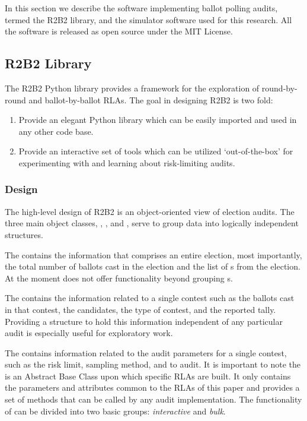 In this section we describe the software implementing ballot polling audits, termed the R2B2 library, and the simulator software used for this research. All the software is released as open source under the MIT License.
\subsection{R2B2 Library}

The R2B2 Python library \cite{r2b2_anon} provides a framework for the exploration of round-by-round
and ballot-by-ballot RLAs. The goal in designing R2B2 is two fold:
\begin{enumerate}
    \item Provide an elegant Python library which can be easily imported and used
    in any other code base.
    \item Provide an interactive set of tools which can be utilized `out-of-the-box'
    for experimenting with and learning about risk-limiting audits.
\end{enumerate}

\subsubsection{Design}

The high-level design of R2B2 is an object-oriented view of election audits.
The three main object classes, , , and ,
serve to group data into logically independent structures.

The  contains the information that comprises an entire election,
most importantly, the total number of ballots cast in the election and the list
of s from the election. At the moment  does not offer
functionality beyond grouping s.

The  contains the information related to a single
contest such as the ballots cast in that contest, the candidates, the type of contest,
and the reported tally. Providing a structure to hold this information independent of
any particular audit is especially useful for exploratory work.

The  contains information related to the audit parameters for a single contest, 
such as the risk limit, sampling method, and  to audit. It is important
to note the  is an Abstract Base Class upon which specific RLAs are built.
It only contains the parameters and attributes common to the RLAs of this paper and provides a set
of methods that can be called by any audit implementation. The functionality of
 can be divided into two basic groups: \textit{interactive}
and \textit{bulk}.

